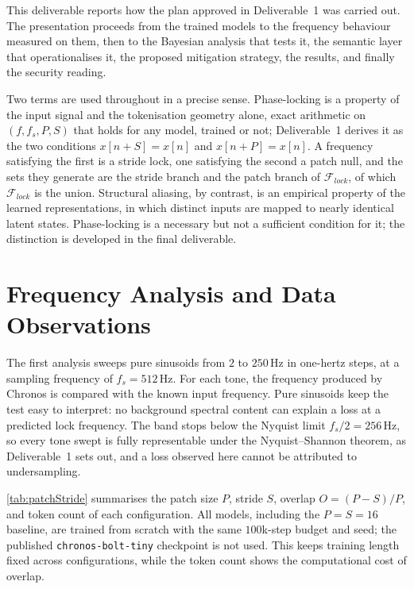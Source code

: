 This deliverable reports how the plan approved in Deliverable~1 was carried out. The presentation proceeds from the trained models to the frequency behaviour measured on them, then to the Bayesian analysis that tests it, the semantic layer that operationalises it, the proposed mitigation strategy, the results, and finally the security reading.

Two terms are used throughout in a precise sense. Phase-locking is a property of the input signal and the tokenisation geometry alone, exact arithmetic on $(f,f_s,P,S)$ that holds for any model, trained or not; Deliverable~1 derives it as the two conditions $x[n+S]=x[n]$ and $x[n+P]=x[n]$. A frequency satisfying the first is a stride lock, one satisfying the second a patch null, and the sets they generate are the stride branch and the patch branch of $\mathcal F_{lock}$, of which $\mathcal F_{lock}$ is the union. Structural aliasing, by contrast, is an empirical property of the learned representations, in which distinct inputs are mapped to nearly identical latent states. Phase-locking is a necessary but not a sufficient condition for it; the distinction is developed in the final deliverable.

\section{Frequency Analysis and Data Observations}
\label{sec:analysis}



The first analysis sweeps pure sinusoids from $2$ to $250$\,Hz in one-hertz steps, at a sampling frequency of $f_s=512$\,Hz. For each tone, the frequency produced by Chronos is compared with the known input frequency. Pure sinusoids keep the test easy to interpret: no background spectral content can explain a loss at a predicted lock frequency. The band stops below the Nyquist limit $f_s/2=256$\,Hz, so every tone swept is fully representable under the Nyquist--Shannon theorem, as Deliverable~1 sets out, and a loss observed here cannot be attributed to undersampling.

\autoref{tab:patchStride} summarises the patch size $P$, stride $S$, overlap $O=(P-S)/P$, and token count of each configuration. All models, including the $P{=}S{=}16$ baseline, are trained from scratch with the same $100$k-step budget and seed; the published \texttt{chronos-bolt-tiny} checkpoint is not used. This keeps training length fixed across configurations, while the token count shows the computational cost of overlap.

